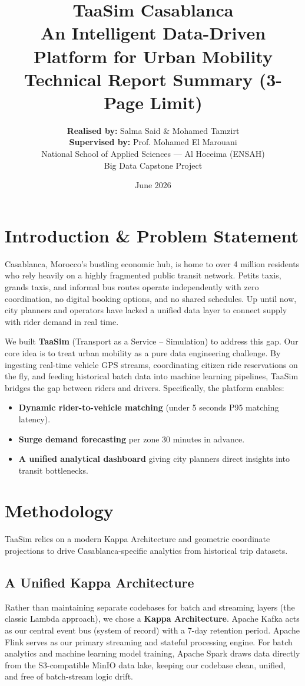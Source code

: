 \documentclass[11pt,a4paper]{article}
\title{\textbf{TaaSim Casablanca \\ An Intelligent Data-Driven Platform for Urban Mobility \\ \Large Technical Report Summary (3-Page Limit)}}
\author{
  \textbf{Realised by:} Salma Said \& Mohamed Tamzirt \\
  \textbf{Supervised by:} Prof. Mohamed El Marouani \\
  \small National School of Applied Sciences --- Al Hoceima (ENSAH) \\
  \small Big Data Capstone Project
}
\date{June 2026}
\begin{document}
\maketitle

\section{Introduction \& Problem Statement}
Casablanca, Morocco's bustling economic hub, is home to over 4 million residents who rely heavily on a highly fragmented public transit network. Petits taxis, grands taxis, and informal bus routes operate independently with zero coordination, no digital booking options, and no shared schedules. Up until now, city planners and operators have lacked a unified data layer to connect supply with rider demand in real time.

We built \textbf{TaaSim} (Transport as a Service -- Simulation) to address this gap. Our core idea is to treat urban mobility as a pure data engineering challenge. By ingesting real-time vehicle GPS streams, coordinating citizen ride reservations on the fly, and feeding historical batch data into machine learning pipelines, TaaSim bridges the gap between riders and drivers. Specifically, the platform enables:
\begin{itemize}
    \item \textbf{Dynamic rider-to-vehicle matching} (under 5 seconds P95 matching latency).
    \item \textbf{Surge demand forecasting} per zone 30 minutes in advance.
    \item \textbf{A unified analytical dashboard} giving city planners direct insights into transit bottlenecks.
\end{itemize}

\section{Methodology}
TaaSim relies on a modern Kappa Architecture and geometric coordinate projections to drive Casablanca-specific analytics from historical trip datasets.

\subsection{A Unified Kappa Architecture}
Rather than maintaining separate codebases for batch and streaming layers (the classic Lambda approach), we chose a \textbf{Kappa Architecture}. Apache Kafka acts as our central event bus (system of record) with a 7-day retention period. Apache Flink serves as our primary streaming and stateful processing engine. For batch analytics and machine learning model training, Apache Spark draws data directly from the S3-compatible MinIO data lake, keeping our codebase clean, unified, and free of batch-stream logic drift.
\end{document}
